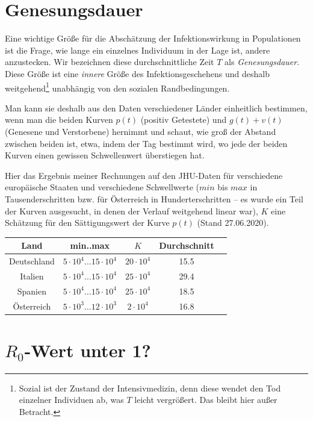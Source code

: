 \documentclass[a4paper,11pt]{article}
\newcommand{\m}{\cdot}
\begin{document}
\section{Genesungsdauer}

Eine wichtige Größe für die Abschätzung der Infektionswirkung in Populationen
ist die Frage, wie lange ein einzelnes Individuum in der Lage ist, andere
anzustecken.  Wir bezeichnen diese durchschnittliche Zeit $T$ als
\emph{Genesungsdauer}. Diese Größe ist eine \emph{innere} Größe des
Infektionsgeschehens und deshalb weitgehend\footnote{Sozial ist der Zustand
  der Intensivmedizin, denn diese wendet den Tod einzelner Individuen ab, was
  $T$ leicht vergrößert. Das bleibt hier außer Betracht.} unabhängig von den
sozialen Randbedingungen.

Man kann sie deshalb aus den Daten verschiedener Länder einheitlich bestimmen,
wenn man die beiden Kurven $p(t)$ (positiv Getestete) und $g(t)+v(t)$
(Genesene und Verstorbene) hernimmt und schaut, wie groß der Abstand zwischen
beiden ist, etwa, indem der Tag bestimmt wird, wo jede der beiden Kurven einen
gewissen Schwellenwert überstiegen hat.

Hier das Ergebnis meiner Rechnungen auf den JHU-Daten für verschiedene
europäische Staaten und verschiedene Schwellwerte ($min$ bis $max$ in
Tausenderschritten bzw. für Österreich in Hunderterschritten -- es wurde ein
Teil der Kurven ausgesucht, in denen der Verlauf weitgehend linear war), $K$
eine Schätzung für den Sättigungswert der Kurve $p(t)$ (Stand 27.06.2020).

\begin{center}
  \begin{tabular}{|c|c|c|c|c|}\hline
    Land   & min..max & $K$ & Durchschnitt \\\hline
    Deutschland & $5\m10^4\dots 15\m10^4$ & $20\m 10^4$ & 15.5\\
    Italien & $5\m10^4\dots 15\m10^4$ & $25\m 10^4$ & 29.4\\
    Spanien & $5\m10^4\dots 15\m10^4$ & $25\m 10^4$ & 18.5\\
    Österreich & $5\m10^3\dots 12\m10^3$ & $2\m 10^4$ & 16.8\\\hline
  \end{tabular}
\end{center}

\section{$R_0$-Wert unter 1?}
\end{document}
